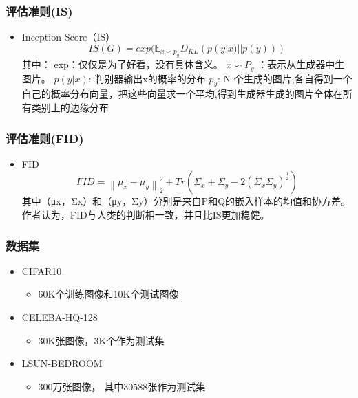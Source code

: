 \documentclass{beamer}
\begin{document}
\begin{frame}[c]\frametitle{评估准则(IS)}
    \begin{itemize}
        \item Inception Score（IS）
        $$IS(G) = exp(\mathbb{E}_{x\backsim p_g}D_{KL}(p(y|x)||p(y)))$$
        其中：\newline
        exp：仅仅是为了好看，没有具体含义。\newline
        $x\backsim P_g$ ：表示从生成器中生图片。\newline
        $p(y|x)$: 判别器输出x的概率的分布  \newline
        $p_y$: N 个生成的图片,各自得到一个自己的概率分布向量，把这些向量求一个平均,得到生成器生成的图片全体在所有类别上的边缘分布
    \end{itemize}
\end{frame}

\begin{frame}[c]\frametitle{评估准则(FID)}
    \begin{itemize}
        \item FID
        $$FID =  \left \| \mu_x - \mu_y \right \|_2^2 + Tr(\Sigma_x + \Sigma_y - 2(\Sigma_x\Sigma_y)^\frac{1}{2}{})$$
        其中（μx，Σx）和（μy，Σy）分别是来自P和Q的嵌入样本的均值和协方差。作者认为，FID与人类的判断相一致，并且比IS更加稳健。
    \end{itemize}
\end{frame}

\begin{frame}[c]\frametitle{数据集}
    \begin{itemize}
        \item CIFAR10
        \begin{itemize}
            \item 60K个训练图像和10K个测试图像
        \end{itemize}
        \item CELEBA-HQ-128
        \begin{itemize}
            \item 30K张图像，3K个作为测试集
        \end{itemize}
        \item LSUN-BEDROOM
        \begin{itemize}
            \item 300万张图像， 其中30588张作为测试集
        \end{itemize}
    \end{itemize}
\end{frame}
\end{document}
